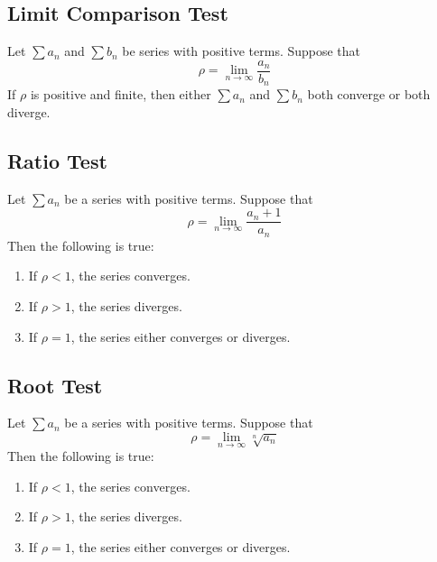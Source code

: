 \documentclass[11pt]{article}
\begin{document}

\subsection{Limit Comparison Test}
Let $\sum a_n$ and $\sum b_n$ be series with positive terms. Suppose that
\[ \rho = \lim_{n \to \infty} \frac{a_n}{b_n } \]
If $\rho$ is positive and finite, then either $\sum a_n$ and $\sum b_n$ both converge or both diverge. 


\subsection{Ratio Test}
Let $\sum a_n$ be a series with positive terms. Suppose that
\[ \rho = \lim_{n \to \infty} \frac{a_n+1}{a_n}\]
Then the following is true:\\

\begin{center}
\begin{enumerate}
    \item If $\rho<1$, the series converges.
    \item If $\rho>1$, the series diverges.
    \item If $\rho=1$, the series either converges or diverges.
\end{enumerate}
\end{center}
\vspace{0.5 cm}


\subsection{Root Test}
Let $\sum a_n$ be a series with positive terms. Suppose that
\[ \rho = \lim_{n \to \infty} \sqrt[n]{a_n}\]
Then the following is true:\\

\begin{center}
\begin{enumerate}
    \item If $\rho<1$, the series converges.
    \item If $\rho>1$, the series diverges.
    \item If $\rho=1$, the series either converges or diverges.
\end{enumerate}
\end{center}
\vspace{0.5 cm}
\end{document}

